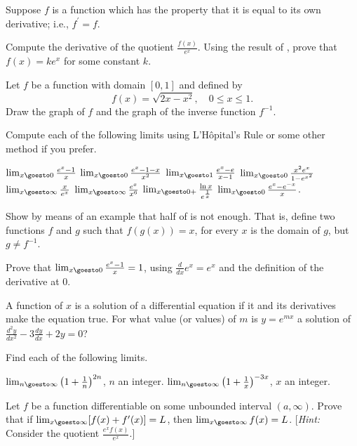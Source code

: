 \begin{exercises}
Suppose $f$ is a function which has the property
that it is equal to its own derivative;
i.e., $f^\prime = f$.
\begin{exenum}
\x
{}
Compute the derivative of the quotient
$\frac{f(x)}{e^x}$.
\x
Using the result of ,
prove that $f(x) = ke^x$ for some constant $k$.
\end{exenum}

Let $f$ be a function with domain
$[0,1]$ and defined by
\[
f(x) = \sqrt{2x-x^2}, \quad 0 \leq x \leq 1
.
\]
Draw the graph of $f$ and the graph of the
inverse function $f^{-1}$.

Compute each of the following limits using
L'H\^opital's Rule or some other method if you prefer.
\begin{exenum}
\x
$\lim_{x\goesto0} \frac{e^x-1}x$
\x
$\lim_{x\goesto0} \frac{e^x-1-x}{x^2}$
\x
$\lim_{x\goesto1} \frac{e^x-e}{x-1}$
\x
$\lim_{x\goesto0} \frac{x^2e^x}{1-e^{x^2}}$
\x
$\lim_{x\goesto\infty} \frac{x}{e^x}$
\x
$\lim_{x\goesto\infty} \frac{e^x}{x^6}$
\x
$\lim_{x\goesto0+} \frac{\ln x}{e^\frac1x}$
\x
$\lim_{x\goesto0} \frac{e^x-e^{-x}}x$.
\end{exenum}

Show by means of an example that half of
 is not enough.
That is, define two functions $f$ and $g$
such that $f(g(x)) = x$, for every $x$ is the
domain of $g$, but $g \ne f^{-1}$.

Prove that $\lim_{x\goesto0} \frac{e^x-1}x = 1$,
using $\frac{d}{dx} e^x = e^x$
and the definition of the derivative at $0$.

A function of $x$ is a solution of a differential
equation if it and its derivatives make the equation true.
For what value (or values) of $m$ is $y = e^{mx}$
a solution of
$\frac{d^2y}{dx^2} - 3 \frac{dy}{dx} + 2y = 0$?

Find each of the following limits.
\begin{exenum}
\x
$\lim_{n\goesto\infty} \left(1+ \frac1n\right)^{2n}$,
\quad $n$ an integer.
\x
$\lim_{n\goesto\infty} \left(1+ \frac1x\right)^{-3x}$,
\quad $x$ an integer.
\end{exenum}

Let $f$ be a function differentiable on some
unbounded interval $(a, \infty)$.
Prove that if
$\lim_{x\goesto\infty} [f(x) + f^\prime(x)] = L$,
then $\lim_{x\goesto\infty} f(x) = L$.
[\emph{Hint:} Consider the quotient
$\frac{e^xf(x)}{e^x}$.]

\end{exercises}
